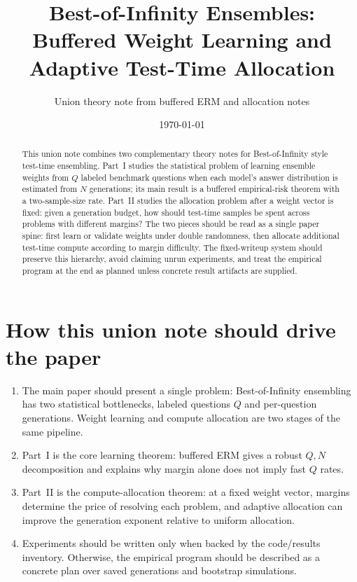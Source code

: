 \documentclass[11pt]{article}
\title{Best-of-Infinity Ensembles:\\ Buffered Weight Learning and Adaptive Test-Time Allocation}
\author{Union theory note from buffered ERM and allocation notes}
\date{\today}
\begin{document}
\maketitle

\begin{abstract}
This union note combines two complementary theory notes for Best-of-Infinity style test-time ensembling.  Part~I studies the statistical problem of learning ensemble weights from $Q$ labeled benchmark questions when each model's answer distribution is estimated from $N$ generations; its main result is a buffered empirical-risk theorem with a two-sample-size rate.  Part~II studies the allocation problem after a weight vector is fixed: given a generation budget, how should test-time samples be spent across problems with different margins?  The two pieces should be read as a single paper spine: first learn or validate weights under double randomness, then allocate additional test-time compute according to margin difficulty.  The fixed-writeup system should preserve this hierarchy, avoid claiming unrun experiments, and treat the empirical program at the end as planned unless concrete result artifacts are supplied.
\end{abstract}

\section*{How this union note should drive the paper}
\begin{enumerate}[label=(\roman*)]
\item The main paper should present a single problem: Best-of-Infinity ensembling has two statistical bottlenecks, labeled questions $Q$ and per-question generations.  Weight learning and compute allocation are two stages of the same pipeline.
\item Part~I is the core learning theorem: buffered ERM gives a robust $Q,N$ decomposition and explains why margin alone does not imply fast $Q$ rates.
\item Part~II is the compute-allocation theorem: at a fixed weight vector, margins determine the price of resolving each problem, and adaptive allocation can improve the generation exponent relative to uniform allocation.
\item Experiments should be written only when backed by the code/results inventory.  Otherwise, the empirical program should be described as a concrete plan over saved generations and bootstrap simulations.
\end{enumerate}
\end{document}
